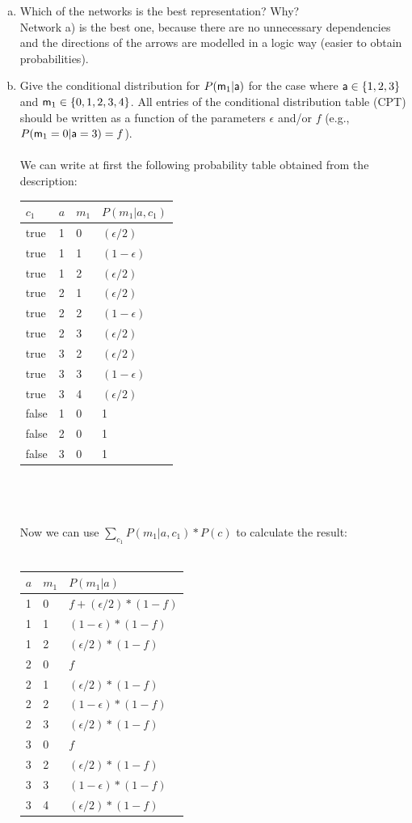 \documentclass[12pt,a4paper,oneside]{article}
\begin{document}
\begin{enumerate}[a)]
  
\item Which of the networks is the best representation? Why?\\
Network a) is the best one, because there are no unnecessary dependencies and the directions of the arrows are  modelled in a logic way (easier to obtain probabilities).
\item Give the conditional distribution for $P(\rv{m}_1|\rv{a})$ for the case
  where $\rv{a}\in\{1,2,3\}$ and $\rv{m}_1\in\{0,1,2,3,4\}$. All entries of the
  conditional distribution table (CPT) should be written as a function of the
  parameters $\epsilon$ and/or $f$ (e.g., $P(\rv{m}_1=0|\rv{a}=3)=f$). \\ \\
We can write at first the following probability table obtained from the description: \\
\begin{tabular}{l|l|l|l}
$c_1$ & $a$ & $m_1$ & $P(m_1|a,c_1)$ \\ \hline
true  & 1 & 0 & $(\epsilon/2)$ \\
true  & 1 & 1 & $(1-\epsilon)$ \\
true  & 1 & 2 & $(\epsilon/2)$ \\
true  & 2 & 1 & $(\epsilon/2)$ \\
true  & 2 & 2 & $(1-\epsilon)$ \\
true  & 2 & 3 & $(\epsilon/2)$ \\
true  & 3 & 2 & $(\epsilon/2)$ \\
true  & 3 & 3 & $(1-\epsilon)$ \\
true  & 3 & 4 & $(\epsilon/2)$ \\
false & 1 & 0 & 1 \\
false & 2 & 0 & 1 \\
false & 3 & 0 & 1 \\
\end{tabular}  \\ \\ \\
Now we can use $\sum_{c_1} P(m_1|a,c_1)*P(c)$ to calculate the result:\\ \\
\begin{tabular}{l|l|l}
	$a$ & $m_1$ & $P(m_1|a)$ \\ \hline
	1 & 0 & $f + (\epsilon/2)*(1-f)$ \\
	1 & 1 & $(1-\epsilon)*(1-f)$ \\
	1 & 2 & $(\epsilon/2)*(1-f)$ \\
	2 & 0 & $f$ \\
	2 & 1 & $(\epsilon/2)*(1-f)$ \\
	2 & 2 & $(1-\epsilon)*(1-f)$ \\
	2 & 3 & $(\epsilon/2)*(1-f)$ \\
	3 & 0 & $f$ \\
	3 & 2 & $(\epsilon/2)*(1-f)$ \\
	3 & 3 & $(1-\epsilon)*(1-f)$ \\
	3 & 4 & $(\epsilon/2)*(1-f)$ \\
\end{tabular}
  

\end{enumerate}
\end{document}
